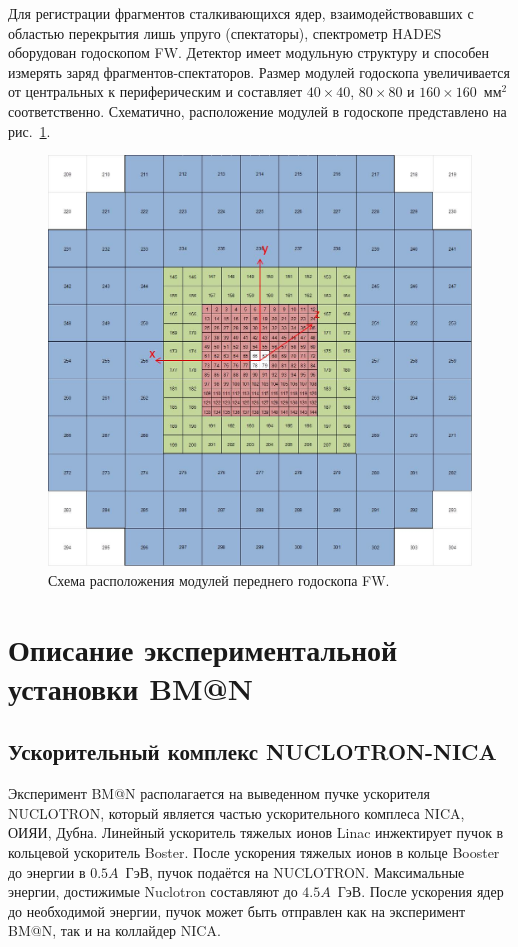 Для регистрации фрагментов сталкивающихся ядер, взаимодействовавших с областью перекрытия лишь упруго (спектаторы), спектрометр HADES оборудован годоскопом FW.
Детектор имеет модульную структуру и способен измерять заряд фрагментов-спектаторов.
Размер модулей годоскопа увеличивается от центральных к периферическим и составляет $40\times40$, $80\times80$ и $160\times160$~мм$^2$ соответственно.
Схематично, расположение модулей в годоскопе представлено на рис.~\ref{fig:hodo_layout}.
%
\begin{figure}[ht]
\begin{center}
\includegraphics[width=0.55\linewidth]{images/FW_layout.jpg}
\caption{Схема расположения модулей переднего годоскопа FW.}
\label{fig:hodo_layout}
\end{center}
\end{figure}

\section{Описание экспериментальной установки BM@N}

\subsection{Ускорительный комплекс NUCLOTRON-NICA}

Эксперимент BM@N располагается на выведенном пучке ускорителя NUCLOTRON, который является частью ускорительного комплеса NICA, ОИЯИ, Дубна.
Линейный ускоритель тяжелых ионов Linac инжектирует пучок в кольцевой ускоритель Boster.
После ускорения тяжелых ионов в кольце Booster до энергии в $0.5A$~ГэВ, пучок подаётся на NUCLOTRON.
Максимальные энергии, достижимые Nuclotron составляют до $4.5A$~ГэВ.
После ускорения ядер до необходимой энергии, пучок может быть отправлен как на эксперимент BM@N, так и на коллайдер NICA.

